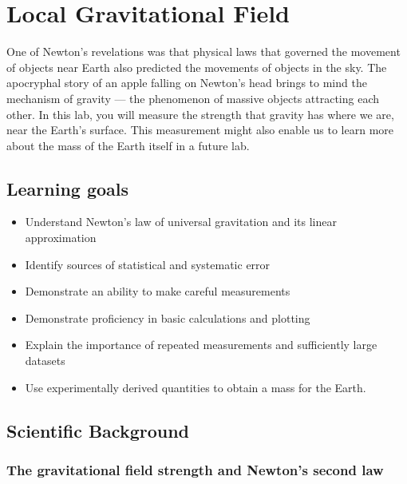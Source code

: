 \chapter{Local Gravitational Field}

One of Newton's revelations was that physical laws that governed the movement of objects near Earth also predicted the movements of objects in the sky.
The apocryphal story of an apple falling on Newton's head brings to mind the mechanism of gravity --- the phenomenon of massive objects attracting each other.
In this lab, you will measure the strength that gravity has where we are, near the Earth's surface. This measurement might also enable us to learn more about the mass of the Earth itself in a future lab.

\section{Learning goals}

\begin{itemize}
	\item Understand Newton's law of universal gravitation and its linear approximation
	
	\item Identify sources of statistical and systematic error
	
	\item Demonstrate an ability to make careful measurements
	
	\item Demonstrate proficiency in basic calculations and plotting
	
	\item Explain the importance of repeated measurements and sufficiently large datasets
	
	\item Use experimentally derived quantities to obtain a mass for the Earth.
\end{itemize}

\section{Scientific Background}

\subsection{The gravitational field strength and Newton's second law}

